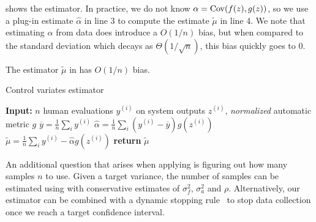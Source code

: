  shows the estimator.
In practice, we do not know $\alpha = \operatorname{Cov}(f(z),g(z))$, so we use a plug-in estimate $\hat{\alpha}$ in line 3 to compute the estimate $\widetilde{\mu}$ in line 4.
We note that estimating $\alpha$ from data does introduce a $O(1/n)$ bias,
but when compared to the standard deviation which decays as $\Theta(1/\sqrt{n})$, this bias quickly goes to $0$.

\begin{proposition}
\label{prop:added_bias}
The estimator $\widetilde{\mu}$ in  has $O(1/n)$ bias.
\end{proposition}

\begin{algorithm}
      \caption{\label{alg:estimate}Control variates estimator}
      \begin{algorithmic}[1]
   \State{} {\bfseries Input:} $n$ human evaluations $y^{(i)}$ on system outputs $z^{(i)}$, \textit{normalized} automatic metric $g$ 
   \State{} $\overline{y} = \frac{1}{n} \sum_i y^{(i)}$
   \State{} $\hat{\alpha} = \frac{1}{n} \sum_i (y^{(i)} - \overline{y}) g(z^{(i)})$
   \State{} $\widetilde{\mu} = \frac{1}{n} \sum_i y^{(i)} - \hat{\alpha} g(z^{(i)})$
   \State{} {\bfseries return} $\widetilde{\mu}$
\end{algorithmic}
\end{algorithm}

An additional question that arises when applying  is figuring out how many samples $n$ to use.
Given a target variance, the number of samples can be estimated using  with conservative estimates of $\sigma^2_f$, $\sigma^2_a$ and $\rho$.
Alternatively, our estimator can be combined with a dynamic stopping rule~\citep{mnih2008empirical} to stop data collection once we reach a target confidence interval.

